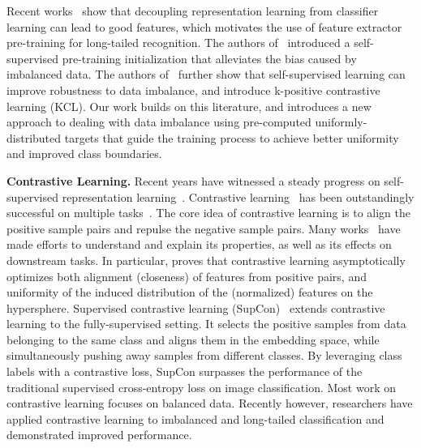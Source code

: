 \documentclass[10pt,twocolumn,letterpaper]{article}
\begin{document}
Recent works~\cite{kang2019decoupling,zhou2020bbn,yang2021delving} show that decoupling representation learning from classifier learning can lead to good features, which motivates the use of feature extractor pre-training for long-tailed recognition. The authors of~\cite{yang2020rethinking} introduced a self-supervised pre-training initialization that alleviates the bias caused by imbalanced data. The authors of~\cite{kang2020exploring} further show that self-supervised learning can improve robustness to data imbalance, and introduce k-positive contrastive learning (KCL). 
Our work builds on this literature, and introduces a new approach to dealing with data imbalance using pre-computed uniformly-distributed targets that guide the training process to achieve better uniformity and improved class boundaries. 
 


\textbf{Contrastive Learning.}
Recent years have witnessed a steady progress on self-supervised representation learning~\cite{oord2018representation, doersch2015unsupervised,huang2017multi, noroozi2016unsupervised,fan2018end,fan2019controllable,fan2017adversarial,li2021self, fan2020learning,li2019making,fan2020home,zhao2018through,zhao2018rf}. Contrastive learning~\cite{he2020momentum,chen2020simple, chen2021exploring, khosla2020supervised,fan2021does, wang2020understanding, li2020making, grill2020bootstrap} has been outstandingly successful on multiple tasks~\cite{li2022rf, wu2021consistency, morgado2021robust}. The core idea of contrastive learning is to align the positive sample pairs and repulse the negative sample pairs. Many works~\cite{wang2020understanding, tian2020makes, li2020making, tian2021understanding, graf2021dissecting} have made efforts to understand and explain its properties, as well as its effects on downstream tasks. 
In particular, \cite{wang2020understanding} proves that contrastive learning asymptotically optimizes both
alignment (closeness) of features from positive pairs, and uniformity of the induced distribution of the (normalized) features on the hypersphere. 
 Supervised contrastive learning (SupCon)~\cite{khosla2020supervised} extends contrastive learning to the fully-supervised setting. It selects the positive samples from data belonging to the same class and aligns them in the embedding space, while simultaneously pushing away samples from different classes. By leveraging class labels with a contrastive loss, SupCon surpasses the performance  of the traditional supervised cross-entropy loss on image classification. Most work on contrastive learning focuses on balanced data. Recently however, researchers have applied contrastive learning to imbalanced and long-tailed classification and demonstrated improved performance\cite{kang2020exploring,yang2020rethinking}. 
 
\end{document}
